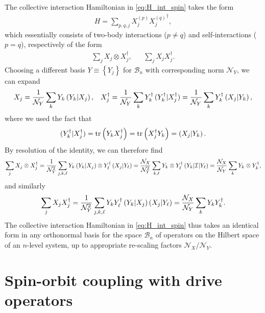 \documentclass[nofootinbib,notitlepage,11pt]{revtex4-2}
\newcommand{\f}[2]{\dfrac{#1}{#2}} %
\newcommand{\p}[1]{\left(#1\right)} %
\renewcommand{\set}[1]{\left\{#1\right\}} %
\newcommand{\1}{\mathds{1}}
\newcommand{\B}{\mathcal{B}}
\newcommand{\I}{\mathcal{I}}
\newcommand{\N}{\mathcal{N}}
\def\obk#1{\mathinner{({#1})}}
\begin{document}
The collective interaction Hamiltonian in \eqref{eq:H_int_spin} takes
the form
\begin{align}
  H = \sum_{p,q,j} X_j^{(p)} {X_j^{(q)}}^\dag,
\end{align}
which essentially consists of two-body interactions ($p\ne q$) and
self-interactions ($p=q$), respectively of the form
\begin{align}
  \sum_j X_j \otimes X_j^\dag,
  &&
  \sum_j X_j X_j^\dag.
\end{align}
Choosing a different basis $Y\equiv\set{Y_j}$ for $\B_n$ with
corresponding norm $\N_Y$, we can expand
\begin{align}
  X_j = \f1{\N_Y} \sum_k Y_k \obk{Y_k|X_j},
  &&
  X_j^\dag = \f1{\N_Y} \sum_k Y_k^\dag \obk{Y_k^\dag|X_j^\dag}
  = \f1{\N_Y} \sum_k Y_k^\dag \obk{X_j|Y_k},
\end{align}
where we used the fact that
\begin{align}
  \obk{Y_k^\dag|X_j^\dag}
  = \tr\p{Y_k X_j^\dag}
  = \tr\p{X_j^\dag Y_k}
  = \obk{X_j|Y_k}.
\end{align}
By resolution of the identity, we can therefore find
\begin{align}
  \sum_j X_j \otimes X_j^\dag
  = \f1{\N_Y^2} \sum_{j,k,\ell} Y_k \obk{Y_k|X_j}
  \otimes Y_\ell^\dag \obk{X_j|Y_\ell}
  = \f{\N_X}{\N_Y^2} \sum_{k,\ell} Y_k \otimes Y_\ell^\dag
  \obk{Y_k|\I|Y_\ell}
  = \f{\N_X}{\N_Y} \sum_k Y_k \otimes Y_k^\dag,
\end{align}
and similarly
\begin{align}
  \sum_j X_j X_j^\dag
  = \f1{\N_Y^2} \sum_{j,k,\ell} Y_k Y_\ell^\dag
  \obk{Y_k|X_j} \obk{X_j|Y_\ell}
  = \f{\N_X}{\N_Y} \sum_k Y_k Y_k^\dag.
\end{align}
The collective interaction Hamiltonian in \eqref{eq:H_int_spin} thus
takes an identical form in any orthonormal basis for the space $\B_n$
of operators on the Hilbert space of an $n$-level system, up to
appropriate re-scaling factors $\N_X/\N_Y$.

\section{Spin-orbit coupling with drive operators}
\label{sec:lat_drive}
\end{document}

